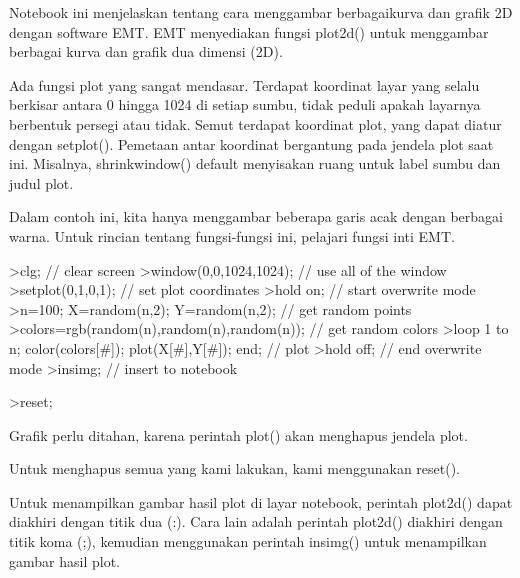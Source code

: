 \documentclass[a4paper,10pt]{article}
\begin{document}
\begin{eulernotebook}
\begin{eulercomment}
Notebook ini menjelaskan tentang cara menggambar berbagaikurva dan
grafik 2D dengan software EMT. EMT menyediakan fungsi plot2d() untuk
menggambar berbagai kurva dan grafik dua dimensi (2D).\\
\end{eulercomment}
\begin{eulercomment}
Ada fungsi plot yang sangat mendasar. Terdapat koordinat layar yang
selalu berkisar antara 0 hingga 1024 di setiap sumbu, tidak peduli
apakah layarnya berbentuk persegi atau tidak. Semut terdapat koordinat
plot, yang dapat diatur dengan setplot(). Pemetaan antar koordinat
bergantung pada jendela plot saat ini. Misalnya, shrinkwindow()
default menyisakan ruang untuk label sumbu dan judul plot.

Dalam contoh ini, kita hanya menggambar beberapa garis acak dengan
berbagai warna. Untuk rincian tentang fungsi-fungsi ini, pelajari
fungsi inti EMT.
\end{eulercomment}
\begin{eulerprompt}
>clg; // clear screen
>window(0,0,1024,1024); // use all of the window
>setplot(0,1,0,1); // set plot coordinates
>hold on; // start overwrite mode
>n=100; X=random(n,2); Y=random(n,2);  // get random points
>colors=rgb(random(n),random(n),random(n)); // get random colors
>loop 1 to n; color(colors[#]); plot(X[#],Y[#]); end; // plot
>hold off; // end overwrite mode
>insimg; // insert to notebook
\end{eulerprompt}
\begin{eulerprompt}
>reset;
\end{eulerprompt}
\begin{eulercomment}
Grafik perlu ditahan, karena perintah plot() akan menghapus jendela
plot.

Untuk menghapus semua yang kami lakukan, kami menggunakan reset().

Untuk menampilkan gambar hasil plot di layar notebook, perintah
plot2d() dapat diakhiri dengan titik dua (:). Cara lain adalah
perintah plot2d() diakhiri dengan titik koma (;), kemudian menggunakan
perintah insimg() untuk menampilkan gambar hasil plot.


\end{eulercomment}
\end{eulernotebook}
\end{document}
